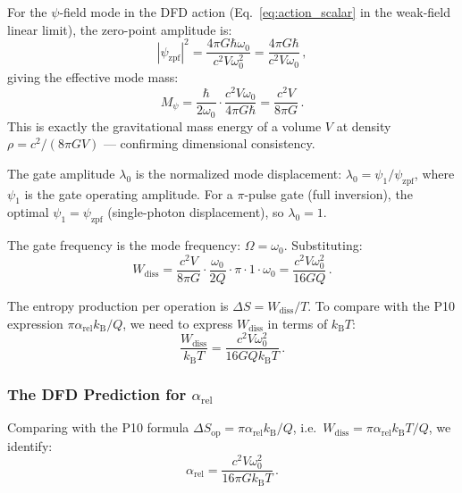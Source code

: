 \documentclass[11pt]{article}
\theoremstyle{definition}
\theoremstyle{remark}
\newcommand{\kB}{k_{\mathrm{B}}}
\begin{document}
For the $\psi$-field mode in the DFD action (Eq.~\eqref{eq:action_scalar} in
the weak-field linear limit), the zero-point amplitude is:
\begin{equation}
|\psi_{\mathrm{zpf}}|^2 = \frac{4\pi G \hbar \omega_0}{c^2 V \omega_0^2}
= \frac{4\pi G \hbar}{c^2 V \omega_0}\,,
\label{eq:psi-zpf}
\end{equation}
giving the effective mode mass:
\begin{equation}
M_\psi = \frac{\hbar}{2\omega_0} \cdot \frac{c^2 V \omega_0}{4\pi G \hbar}
= \frac{c^2 V}{8\pi G}\,.
\label{eq:mode-mass}
\end{equation}
This is exactly the gravitational mass energy of a volume $V$ at density
$\rho = c^2/(8\pi G V)$ --- confirming dimensional consistency.

The gate amplitude $\lambda_0$ is the normalized mode displacement:
$\lambda_0 = \psi_1/\psi_{\mathrm{zpf}}$, where $\psi_1$ is the gate
operating amplitude. For a $\pi$-pulse gate (full inversion), the optimal
$\psi_1 = \psi_{\mathrm{zpf}}$ (single-photon displacement), so
$\lambda_0 = 1$.

The gate frequency is the mode frequency: $\Omega = \omega_0$. Substituting:
\begin{equation}
W_{\mathrm{diss}} = \frac{c^2 V}{8\pi G} \cdot \frac{\omega_0}{2Q}
\cdot \pi \cdot 1 \cdot \omega_0 =
\frac{c^2 V \omega_0^2}{16 G Q}\,.
\label{eq:wdiss-explicit2}
\end{equation}

The entropy production per operation is $\Delta S = W_{\mathrm{diss}}/T$. To
compare with the P10 expression $\pi\alpha_{\mathrm{rel}}\kB/Q$, we need
to express $W_{\mathrm{diss}}$ in terms of $\kB T$:
\begin{equation}
\frac{W_{\mathrm{diss}}}{\kB T} = \frac{c^2 V \omega_0^2}{16 G Q \kB T}\,.
\label{eq:wdiss-ratio}
\end{equation}

\subsubsection{The DFD Prediction for $\alpha_{\mathrm{rel}}$}

Comparing with the P10 formula $\Delta S_{\mathrm{op}} = \pi\alpha_{\mathrm{rel}}\kB/Q$,
i.e.\ $W_{\mathrm{diss}} = \pi\alpha_{\mathrm{rel}}\kB T/Q$, we identify:
\begin{equation}
\alpha_{\mathrm{rel}} = \frac{c^2 V \omega_0^2}{16\pi G \kB T}\,.
\label{eq:alpha-rel-DFD}
\end{equation}
\end{document}
